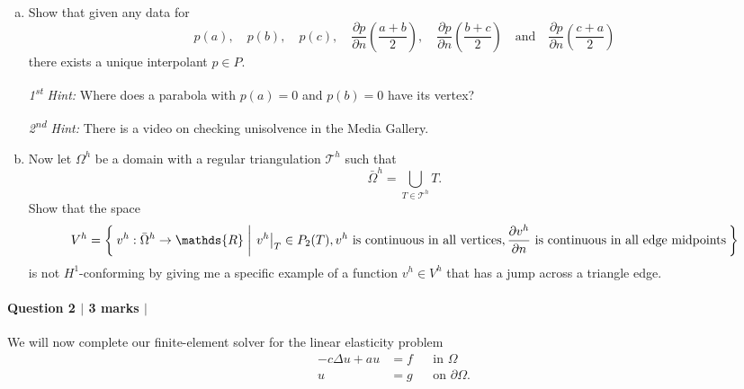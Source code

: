 \documentclass[10pt,letterpaper]{scrartcl}
\begin{document}
\begin{enumerate}[(a)]
\item Show that given any data for
\begin{equation*}
p(a), \quad
p(b),\quad
p(c),\quad
\frac{\partial p}{\partial n}\left(\frac{a+b}{2}\right),\quad
\frac{\partial p}{\partial n}\left(\frac{b+c}{2}\right)\quad \text{and} \quad
\frac{\partial p}{\partial n}\left(\frac{c+a}{2}\right)
\end{equation*}
there exists a unique interpolant $p \in P$.

\emph{1\textsuperscript{st} Hint:} Where does a parabola with $p(a)=0$ and $p(b) = 0$ have its vertex?

\emph{2\textsuperscript{nd} Hint:} There is a video on checking unisolvence in the Media Gallery.
\newpage

\item Now let $\Omega^h$ be a domain with a regular triangulation $\mathcal{T}^h$ such that
\begin{equation*}
\bar{\Omega}^h = \bigcup_{T\in \mathcal{T}^h} T.
\end{equation*}
Show that the space
\begin{equation*}
V^h = \Set{v^h: \bar{\Omega}^h\to \mathds{R} | \left. v^h\right\rvert_T \in P_2(T), v^h \text{ is continuous in all vertices}, \frac{\partial v^h}{\partial n} \text{ is continuous in all edge midpoints} }
\end{equation*}
is not $H^1$-conforming by giving me a specific example of a function $v^h \in V^h$ that has a jump across a triangle edge.
\end{enumerate}
\newpage

\paragraph*{Question 2 $\vert$ 3 marks $\vert$ \faFileCodeO \: \faFilePictureO \: \faFilePdfO}

We will now complete our finite-element solver for the linear elasticity problem
\begin{equation}\label{eq:le}
\begin{aligned}
-c\Delta u + a u &= f &&\text{in } \Omega\\
u &= g && \text{on } \partial\Omega.
\end{aligned}
\end{equation}
\end{document}
